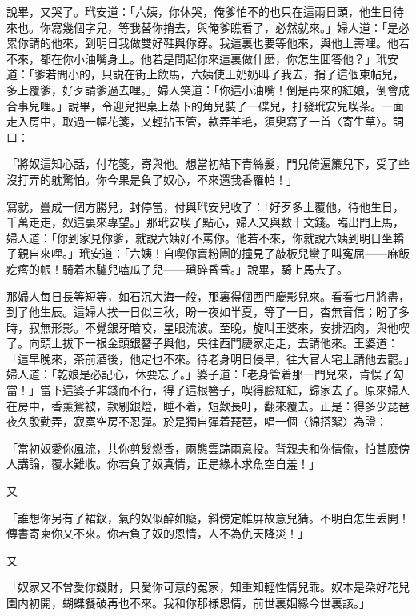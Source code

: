 說畢，又哭了。玳安道：「六姨，你休哭，俺爹怕不的也只在這兩日頭，他生日待來也。你寫幾個字兒，等我替你捎去，與俺爹瞧看了，必然就來。」婦人道：「是必累你請的他來，到明日我做雙好鞋與你穿。我這裏也要等他來，與他上壽哩。他若不來，都在你小油嘴身上。他若是問起你來這裏做什麽，你怎生囬答他？」玳安道：「爹若問小的，只説在街上飲馬，六姨使王奶奶叫了我去，捎了這個柬帖兒，多上覆爹，好歹請爹過去哩。」婦人笑道：「你這小油嘴！倒是再來的紅娘，倒會成合事兒哩。」說畢，令迎兒把桌上蒸下的角兒裝了一碟兒，打發玳安兒喫茶。一面走入房中，取過一幅花箋，又輕拈玉管，款弄羊毛，須臾寫了一首〈寄生草〉。詞曰：
\begin{myquote}
「將奴這知心話，付花箋，寄與他。想當初結下青絲髮，門兒倚遍簾兒下，受了些沒打弄的躭驚怕。你今果是負了奴心，不來還我香羅帕！」
\end{myquote}

寫就，疊成一個方勝兒，封停當，付與玳安兒收了：「好歹多上覆他，待他生日，千萬走走，奴這裏來專望。」那玳安喫了點心，婦人又與數十文錢。臨出門上馬，婦人道：「你到家見你爹，就說六姨好不罵你。他若不來，你就說六姨到明日坐轎子親自來哩。」玳安道：「六姨！自喫你賣粉團的撞見了敲板兒蠻子叫寃屈——麻飯疙瘩的帳！騎着木驢兒嗑瓜子兒——瑣碎昏昏。」說畢，騎上馬去了。

那婦人每日長等短等，如石沉大海一般，那裏得個西門慶影兒來。看看七月將盡，到了他生辰。這婦人挨一日似三秋，盼一夜如半夏，等了一日，杳無音信；盼了多時，寂無形影。不覺銀牙暗咬，星眼流波。至晚，旋叫王婆來，安排酒肉，與他喫了。向頭上拔下一根金頭銀簪子與他，央往西門慶家走走，去請他來。王婆道：「這早晚來，茶前酒後，他定也不來。待老身明日侵早，往大官人宅上請他去罷。」婦人道：「乾娘是必記心，休要忘了。」婆子道：「老身管着那一門兒來，肯悮了勾當！」當下這婆子非錢而不行，得了這根簪子，喫得臉紅紅，歸家去了。原來婦人在房中，香薰鴛被，款剔銀燈，睡不着，短歎長吁，翻來覆去。正是：得多少琵琶夜久殷勤弄，寂寞空房不忍彈。於是獨自彈着琵琶，唱一個〈綿搭絮〉為證：

\begin{myquote}
「當初奴愛你風流，共你剪髮燃香，兩態雲踪兩意投。背親夫和你情偸，怕甚麽傍人講論，覆水難收。你若負了奴真情，正是緣木求魚空自羞！」
\end{myquote}

又
\begin{myquote}
「誰想你另有了裙釵，氣的奴似醉如癡，斜傍定帷屏故意兒猜。不明白怎生丢開！傳書寄柬你又不來。你若負了奴的恩情，人不為仇天降災！」
\end{myquote}

又
\begin{myquote}
「奴家又不曾愛你錢財，只愛你可意的寃家，知重知輕性情兒乖。奴本是朶好花兒園内初開，蝴蝶餐破再也不來。我和你那様恩情，前世裏姻緣今世裏該。」
\end{myquote}

